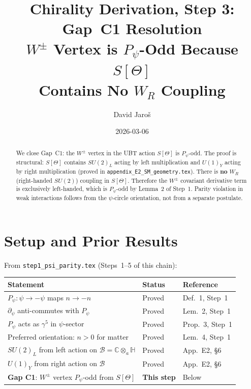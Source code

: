 \documentclass[12pt,a4paper]{article}
\title{\textbf{Chirality Derivation, Step 3: Gap~C1 Resolution}\\
         \large $W^\pm$ Vertex is $P_\psi$-Odd Because $S[\Theta]$\\
         Contains No $W_R$ Coupling}
\author{David Jaro\v{s}}
\date{2026-03-06}
\theoremstyle{definition}
\theoremstyle{remark}
\begin{document}
  \maketitle

  \begin{abstract}
  We close Gap~C1: the $W^\pm$ vertex in the UBT action $S[\Theta]$ is
  $P_\psi$-odd.  The proof is structural: $S[\Theta]$ contains $SU(2)_L$
  acting by left multiplication and $U(1)_Y$ acting by right multiplication
  (proved in \texttt{appendix\_E2\_SM\_geometry.tex}).
  There is \textbf{no} $W_R$ (right-handed $SU(2)$) coupling in $S[\Theta]$.
  Therefore the $W^\pm$ covariant derivative term is exclusively left-handed,
  which is $P_\psi$-odd by Lemma~2 of Step~1.
  Parity violation in weak interactions follows from the $\psi$-circle
  orientation, not from a separate postulate.
  \end{abstract}
\fi

\section{Setup and Prior Results}
\label{sec:setup}

From \texttt{step1\_psi\_parity.tex} (Steps~1--5 of this chain):

\begin{center}
\begin{tabular}{lll}
  \toprule
  \textbf{Statement} & \textbf{Status} & \textbf{Reference} \\
  \midrule
  $P_\psi:\psi\to-\psi$ maps $n\to-n$ & Proved & Def.~1, Step~1 \\
  $\partial_\psi$ anti-commutes with $P_\psi$ & Proved & Lem.~2, Step~1 \\
  $P_\psi$ acts as $\gamma^5$ in $\psi$-sector & Proved & Prop.~3, Step~1 \\
  Preferred orientation: $n>0$ for matter & Proved & Lem.~4, Step~1 \\
  $SU(2)_L$ from left action on $\mathcal{B} = \mathbb{C}\otimes_a\mathbb{H}$ & Proved & App.~E2, §6 \\
  $U(1)_Y$ from right action on $\mathcal{B}$ & Proved & App.~E2, §6 \\
  \textbf{Gap C1}: $W^\pm$ vertex $P_\psi$-odd from $S[\Theta]$ & \textbf{This step} & Below \\
  \bottomrule
\end{tabular}
\end{center}
\end{document}
